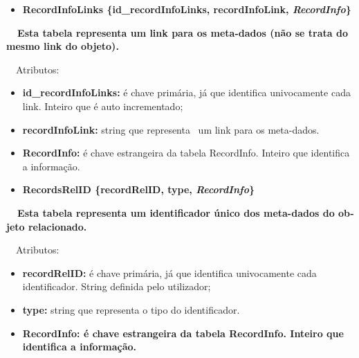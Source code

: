\documentclass[letterpaper]{article}
\newcommand\textstyleStrongEmphasis[1]{\textbf{#1}}
\newcommand\liststyleLi{%
\renewcommand\labelitemi{{\textbullet}}
\renewcommand\labelitemii{[27A2?]}
\renewcommand\labelitemiii{{\textbullet}}
\renewcommand\labelitemiv{{\textbullet}}
}
\newcommand\liststyleLvi{%
\renewcommand\labelitemi{[27A2?]}
\renewcommand\labelitemii{[27A2?]}
\renewcommand\labelitemiii{[27A2?]}
\renewcommand\labelitemiv{[27A2?]}
}
\begin{document}
\bigskip

\liststyleLi
\begin{itemize}
\item {\bfseries
RecordInfoLinks\textmd{ \{}\textmd{id\_recordInfoLinks}\textmd{,
recordInfoLink, }\textmd{\textit{RecordInfo}}\textmd{\}}}
\end{itemize}
{\bfseries
\foreignlanguage{english}{\textmd{\ \ Esta
}}\textstyleStrongEmphasis{\foreignlanguage{english}{\textmd{tabela}}}\foreignlanguage{english}{\textmd{
representa um link para os meta-dados (n\~ao se trata do mesmo link do
objeto)}}\foreignlanguage{english}{\textmd{.}}}


\bigskip

{
\ \ Atributos:}

\liststyleLvi
\begin{itemize}
\item {
\textbf{id\_recordInfoLinks}\textbf{:} \'e chave prim\'aria, j\'a que
identifica univocamente cada link. Inteiro que \'e auto incrementado;}
\item {
\textbf{recordInfoLink:} string que representa \ um link para os
meta-dados.}
\item {
\textbf{RecordInfo:}\textit{ }\'e chave estrangeira da tabela
RecordInfo. Inteiro que identifica a informa\c{c}\~ao.}
\end{itemize}

\bigskip

\liststyleLi
\begin{itemize}
\item {\bfseries
RecordsRelID\textmd{ \{}\textmd{recordRelID}\textmd{, type,
}\textmd{\textit{RecordInfo}}\textmd{\}}}
\end{itemize}
{\bfseries
\foreignlanguage{english}{\textmd{\ \ Esta
}}\textstyleStrongEmphasis{\foreignlanguage{english}{\textmd{tabela}}}\foreignlanguage{english}{\textmd{
representa um identificador \'unico dos meta-dados do objeto
relacionado}}\foreignlanguage{english}{\textmd{.}}}


\bigskip

{
\ \ Atributos:}

\liststyleLvi
\begin{itemize}
\item {
\textbf{recordRelID}\textbf{:} \'e chave prim\'aria, j\'a que identifica
univocamente cada identificador. String definida pelo utilizador;}
\item {
\textbf{type:} string que representa o tipo do identificador.}
\item {\bfseries
RecordInfo:\textmd{\textit{ }}\textmd{\'e chave estrangeira da tabela
RecordInfo. Inteiro que identifica a informa\c{c}\~ao.}}
\end{itemize}
\end{document}
